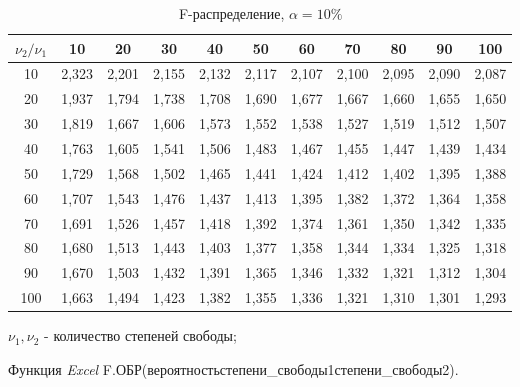 \documentclass[12pt,a4paper]{article}
\begin{document}
\begin{table}[htbp]
  \centering
  \caption{F-распределение, $\alpha=10\%$}
    \begin{tabular}{crrrrrrrrrr}
    \toprule
    $\nu_2/\nu_1$  & \multicolumn{1}{c}{           10   } & \multicolumn{1}{c}{           20   } & \multicolumn{1}{c}{           30   } & \multicolumn{1}{c}{           40   } & \multicolumn{1}{c}{           50   } & \multicolumn{1}{c}{           60   } & \multicolumn{1}{c}{           70   } & \multicolumn{1}{c}{           80   } & \multicolumn{1}{c}{           90   } & \multicolumn{1}{c}{         100   } \\
    \midrule
    10    & 2,323 & 2,201 & 2,155 & 2,132 & 2,117 & 2,107 & 2,100 & 2,095 & 2,090 & 2,087 \\
    20    & 1,937 & 1,794 & 1,738 & 1,708 & 1,690 & 1,677 & 1,667 & 1,660 & 1,655 & 1,650 \\
    30    & 1,819 & 1,667 & 1,606 & 1,573 & 1,552 & 1,538 & 1,527 & 1,519 & 1,512 & 1,507 \\
    40    & 1,763 & 1,605 & 1,541 & 1,506 & 1,483 & 1,467 & 1,455 & 1,447 & 1,439 & 1,434 \\
    50    & 1,729 & 1,568 & 1,502 & 1,465 & 1,441 & 1,424 & 1,412 & 1,402 & 1,395 & 1,388 \\
    60    & 1,707 & 1,543 & 1,476 & 1,437 & 1,413 & 1,395 & 1,382 & 1,372 & 1,364 & 1,358 \\
    70    & 1,691 & 1,526 & 1,457 & 1,418 & 1,392 & 1,374 & 1,361 & 1,350 & 1,342 & 1,335 \\
    80    & 1,680 & 1,513 & 1,443 & 1,403 & 1,377 & 1,358 & 1,344 & 1,334 & 1,325 & 1,318 \\
    90    & 1,670 & 1,503 & 1,432 & 1,391 & 1,365 & 1,346 & 1,332 & 1,321 & 1,312 & 1,304 \\
    100   & 1,663 & 1,494 & 1,423 & 1,382 & 1,355 & 1,336 & 1,321 & 1,310 & 1,301 & 1,293 \\
    \bottomrule
    \end{tabular}%
  \label{tab:addlabel}%
\end{table}%
\textit{$\nu_1,\nu_2$} - количество степеней свободы;

Функция \textit{Excel} F.ОБР(вероятность\;степени\_свободы1\;степени\_свободы2).
\pagebreak
\end{document}
